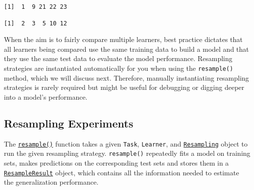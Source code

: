 \begin{Shaded}
\begin{Highlighting}[]
\SpecialCharTok{$}
\SpecialCharTok{$}\NormalTok{(}\NormalTok{)[}\SpecialCharTok{:}\NormalTok{]}
\end{Highlighting}
\end{Shaded}

\begin{verbatim}
[1]  1  9 21 22 23
\end{verbatim}

\begin{Shaded}
\begin{Highlighting}[]
\SpecialCharTok{$}\NormalTok{(}\NormalTok{)[}\SpecialCharTok{:}\NormalTok{]}
\end{Highlighting}
\end{Shaded}

\begin{verbatim}
[1]  2  3  5 10 12
\end{verbatim}

When the aim is to fairly compare multiple learners, best practice
dictates that all learners being compared use the same training data to
build a model and that they use the same test data to evaluate the model
performance. Resampling strategies are instantiated automatically for
you when using the \texttt{resample()} method, which we will discuss
next. Therefore, manually instantiating resampling strategies is rarely
required but might be useful for debugging or digging deeper into a
model's performance.

\hypertarget{sec-resampling-exec}{%
\subsection{Resampling Experiments}\label{sec-resampling-exec}}

The
\href{https://mlr3.mlr-org.com/reference/resample.html}{\texttt{resample()}}
function takes a given \texttt{Task}, \texttt{Learner}, and
\href{https://mlr3.mlr-org.com/reference/Resampling.html}{\texttt{Resampling}}
object to run the given resampling strategy. \texttt{resample()}
repeatedly fits a model on training sets, makes predictions on the
corresponding test sets and stores them in a
\href{https://mlr3.mlr-org.com/reference/ResampleResult.html}{\texttt{ResampleResult}}
object, which contains all the information needed to estimate the
generalization performance.

